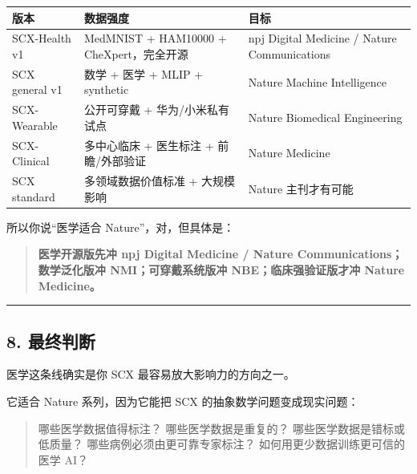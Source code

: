 \documentclass[
  12pt,
]{ctexart}
\begin{document}
\begin{longtable}[]{@{}
  >{\raggedright\arraybackslash}p{}
  >{\raggedright\arraybackslash}p{}
  >{\raggedright\arraybackslash}p{}@{}}
\toprule\noalign{}
\begin{minipage}[b]{\linewidth}\raggedright
版本
\end{minipage} & \begin{minipage}[b]{\linewidth}\raggedright
数据强度
\end{minipage} & \begin{minipage}[b]{\linewidth}\raggedright
目标
\end{minipage} \\
\midrule\noalign{}
\endhead
\bottomrule\noalign{}
\endlastfoot
SCX-Health v1 & MedMNIST + HAM10000 + CheXpert，完全开源 & npj Digital
Medicine / Nature Communications \\
SCX general v1 & 数学 + 医学 + MLIP + synthetic & Nature Machine
Intelligence \\
SCX-Wearable & 公开可穿戴 + 华为/小米私有试点 & Nature Biomedical
Engineering \\
SCX-Clinical & 多中心临床 + 医生标注 + 前瞻/外部验证 & Nature
Medicine \\
SCX standard & 多领域数据价值标准 + 大规模影响 & Nature 主刊才有可能 \\
\end{longtable}

所以你说``医学适合 Nature''，对，但具体是：

\begin{quote}
\textbf{医学开源版先冲 npj Digital Medicine / Nature
Communications；数学泛化版冲 NMI；可穿戴系统版冲 NBE；临床强验证版才冲
Nature Medicine。}
\end{quote}

\begin{center}\rule{0.5\linewidth}{0.5pt}\end{center}

\subsection{8. 最终判断}\label{ux6700ux7ec8ux5224ux65ad-3}

医学这条线确实是你 SCX 最容易放大影响力的方向之一。

它适合 Nature 系列，因为它能把 SCX 的抽象数学问题变成现实问题：

\begin{quote}
哪些医学数据值得标注？ 哪些医学数据是重复的？
哪些医学数据是错标或低质量？ 哪些病例必须由更可靠专家标注？
如何用更少数据训练更可信的医学 AI？
\end{quote}
\end{document}
